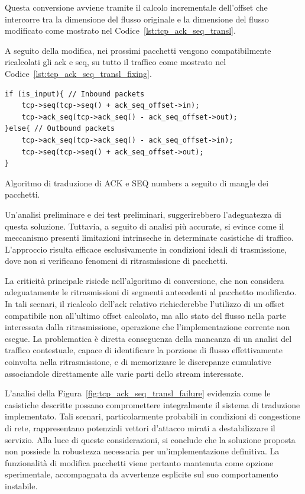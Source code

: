 Questa conversione avviene tramite il calcolo incrementale dell'offset che intercorre tra la dimensione del flusso originale e la dimensione del flusso modificato come mostrato nel Codice~\ref{lst:tcp_ack_seq_transl}.


A seguito della modifica, nei prossimi pacchetti vengono compatibilmente ricalcolati gli \gls{ack} e \gls{seq}, su tutto il traffico come mostrato nel Codice~\ref{lst:tcp_ack_seq_transl_fixing}.
\begin{listing}[H]
\begin{verbatim}
if (is_input){ // Inbound packets
    tcp->seq(tcp->seq() + ack_seq_offset->in);
    tcp->ack_seq(tcp->ack_seq() - ack_seq_offset->out);
}else{ // Outbound packets
    tcp->ack_seq(tcp->ack_seq() - ack_seq_offset->in);
    tcp->seq(tcp->seq() + ack_seq_offset->out);
}
\end{verbatim}
\vspace{-1em}
\caption{Algoritmo di traduzione di ACK e SEQ numbers a seguito di mangle dei pacchetti.}\label{lst:tcp_ack_seq_transl_fixing}
\end{listing}
Un'analisi preliminare e dei test preliminari, suggerirebbero l'adeguatezza di questa soluzione. Tuttavia, a seguito di analisi più accurate, si evince come il meccanismo presenti limitazioni intrinseche in determinate casistiche di traffico. L'approccio risulta efficace esclusivamente in condizioni ideali di trasmissione, dove non si verificano fenomeni di ritrasmissione di pacchetti.

La criticità principale risiede nell'algoritmo di conversione, che non considera adeguatamente le ritrasmissioni di segmenti antecedenti al pacchetto modificato. In tali scenari, il ricalcolo dell'\gls{ack} relativo richiederebbe l'utilizzo di un offset compatibile non all'ultimo offset calcolato, ma allo stato del flusso nella parte interessata dalla ritrasmissione, operazione che l'implementazione corrente non esegue. La problematica è diretta conseguenza della mancanza di un analisi del traffico contestuale, capace di identificare la porzione di flusso effettivamente coinvolta nella ritrasmissione, e di memorizzare le discrepanze cumulative associandole direttamente alle varie parti dello stream interessate.

L'analisi della Figura~\ref{fig:tcp_ack_seq_transl_failure} evidenzia come le casistiche descritte possano compromettere integralmente il sistema di traduzione implementato. Tali scenari, particolarmente probabili in condizioni di congestione di rete, rappresentano potenziali vettori d'attacco mirati a destabilizzare il servizio.
Alla luce di queste considerazioni, si conclude che la soluzione proposta non possiede la robustezza necessaria per un'implementazione definitiva. La funzionalità di modifica pacchetti viene pertanto mantenuta come opzione sperimentale, accompagnata da avvertenze esplicite sul suo comportamento instabile.

